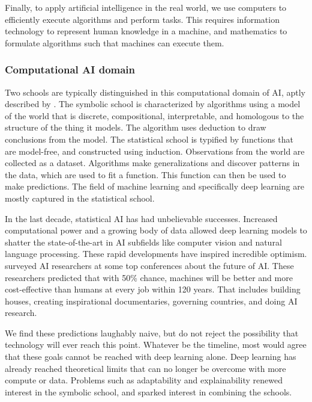 Finally, to apply artificial intelligence in the real world, we use computers to efficiently execute algorithms and perform tasks. This requires information technology to represent human knowledge in a machine, and mathematics to formulate algorithms such that machines can execute them.

\subsubsection{Computational AI domain}

Two schools are typically distinguished in this computational domain of AI, aptly described by \citet{van2019boxology}. The symbolic school is characterized by algorithms using a model of the world that is discrete, compositional, interpretable, and homologous to the structure of the thing it models. The algorithm uses deduction to draw conclusions from the model. The statistical school is typified by functions that are model-free, and constructed using induction. Observations from the world are collected as a dataset. Algorithms make generalizations and discover patterns in the data, which are used to fit a function. This function can then be used to make predictions. The field of machine learning and specifically deep learning are mostly captured in the statistical school.

In the last decade, statistical AI has had unbelievable successes. Increased computational power and a growing body of data allowed deep learning models to shatter the state-of-the-art in AI subfields like computer vision and natural language processing. These rapid developments have inspired incredible optimism. \citet{grace2018will} surveyed AI researchers at some top conferences about the future of AI. These researchers predicted that with 50\% chance, machines will be better and more cost-effective than humans at every job within 120 years. That includes building houses, creating inspirational documentaries, governing countries, and doing AI research.

We find these predictions laughably naive, but do not reject the possibility that technology will ever reach this point. Whatever be the timeline, most would agree that these goals cannot be reached with deep learning alone. Deep learning has already reached theoretical limits that can no longer be overcome with more compute or data. Problems such as adaptability and explainability renewed interest in the symbolic school, and sparked interest in combining the schools. 

